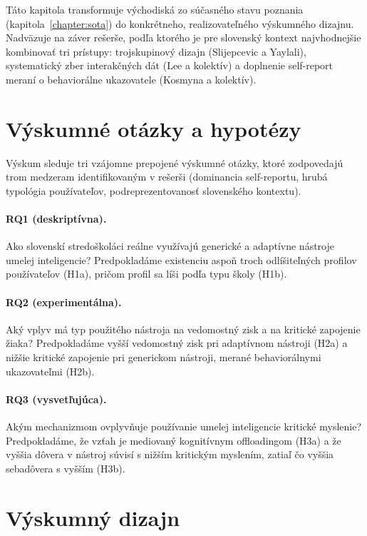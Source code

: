 \begin{aibar}

Táto kapitola transformuje východiská zo súčasného stavu poznania
(kapitola~\ref{chapter:sota}) do konkrétneho, realizovateľného výskumného
dizajnu. Nadväzuje na záver rešerše, podľa ktorého je pre slovenský kontext
najvhodnejšie kombinovať tri prístupy: trojskupinový dizajn (Slijepcevic a
Yaylali), systematický zber interakčných dát (Lee a kolektív) a doplnenie
self-report meraní o behaviorálne ukazovatele (Kosmyna a kolektív).


\section{Výskumné otázky a hypotézy}
\label{sec:rq}

Výskum sleduje tri vzájomne prepojené výskumné otázky, ktoré zodpovedajú
trom medzeram identifikovaným v rešerši (dominancia self-reportu, hrubá
typológia používateľov, podreprezentovanosť slovenského kontextu).

\paragraph{RQ1 (deskriptívna).}
Ako slovenskí stredoškoláci reálne využívajú generické a adaptívne nástroje
umelej inteligencie? Predpokladáme existenciu aspoň troch odlíšiteľných
profilov používateľov (H1a), pričom profil sa líši podľa typu školy (H1b).

\paragraph{RQ2 (experimentálna).}
Aký vplyv má typ použitého nástroja na vedomostný zisk a na kritické zapojenie
žiaka? Predpokladáme vyšší vedomostný zisk pri adaptívnom nástroji (H2a) a
nižšie kritické zapojenie pri generickom nástroji, merané behaviorálnymi
ukazovateľmi (H2b).

\paragraph{RQ3 (vysvetľujúca).}
Akým mechanizmom ovplyvňuje používanie umelej inteligencie kritické myslenie?
Predpokladáme, že vzťah je mediovaný kognitívnym offloadingom (H3a) a že
vyššia dôvera v nástroj súvisí s nižším kritickým myslením, zatiaľ čo vyššia
sebadôvera s vyšším (H3b).


\section{Výskumný dizajn}
\label{sec:design}


\end{aibar}
